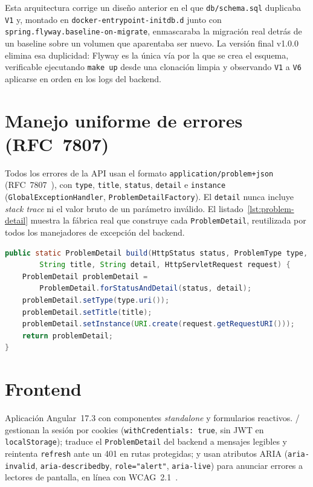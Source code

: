 Esta arquitectura corrige un dise\~no anterior en el que \texttt{db/schema.sql}
duplicaba \texttt{V1} y, montado en \texttt{docker-entrypoint-initdb.d} junto
con \texttt{spring.flyway.baseline-on-migrate}, enmascaraba la migraci\'on
real detr\'as de un baseline sobre un volumen que aparentaba ser nuevo. La
versi\'on final v1.0.0 elimina esa duplicidad: Flyway es la \'unica v\'ia
por la que se crea el esquema, verificable ejecutando \texttt{make up}
desde una clonaci\'on limpia y observando \texttt{V1} a \texttt{V6}
aplicarse en orden en los logs del backend.

\section{Manejo uniforme de errores (RFC~7807)}

Todos los errores de la API usan el formato \texttt{application/problem+json}
(RFC~7807~\cite{rfc7807}), con \texttt{type}, \texttt{title},
\texttt{status}, \texttt{detail} e \texttt{instance}
(\texttt{GlobalExceptionHandler}, \texttt{ProblemDetailFactory}). El
\texttt{detail} nunca incluye \emph{stack trace} ni el valor bruto de un
par\'ametro inv\'alido. El listado~\ref{lst:problem-detail} muestra la
f\'abrica real que construye cada \texttt{ProblemDetail}, reutilizada por
todos los manejadores de excepci\'on del backend.

\begin{lstlisting}[language=Java,caption={F\'abrica de errores RFC~7807 en \texttt{ProblemDetailFactory.java} (fragmento real).},label={lst:problem-detail}]
public static ProblemDetail build(HttpStatus status, ProblemType type,
        String title, String detail, HttpServletRequest request) {
    ProblemDetail problemDetail =
        ProblemDetail.forStatusAndDetail(status, detail);
    problemDetail.setType(type.uri());
    problemDetail.setTitle(title);
    problemDetail.setInstance(URI.create(request.getRequestURI()));
    return problemDetail;
}
\end{lstlisting}

\section{Frontend}

Aplicaci\'on Angular~17.3 con componentes \emph{standalone} y formularios
reactivos. / gestionan
la sesi\'on por cookies (\texttt{withCredentials: true}, sin JWT en
\texttt{localStorage});  traduce el
\texttt{ProblemDetail} del backend a mensajes legibles y reintenta
\texttt{refresh} ante un 401 en rutas protegidas; 
y  usan atributos ARIA
(\texttt{aria-invalid}, \texttt{aria-describedby}, \texttt{role="alert"},
\texttt{aria-live}) para anunciar errores a lectores de pantalla, en
l\'inea con WCAG~2.1~\cite{wcag21}.

